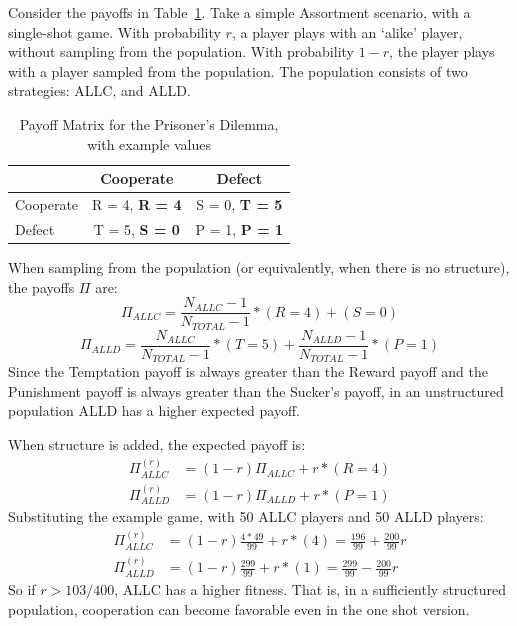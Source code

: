 \documentclass[a4paper,11pt,bcshonoursthesis,singlespace,oneside,thesisdraft,pdflatex]{cssethesis}
\begin{document}
Consider the payoffs in Table~\ref{table:payoffs2}. 
Take a simple Assortment scenario, with a single-shot game. 
With probability $r$, a player plays with an `alike' player, without sampling from the population. 
With probability $1-r$, the player plays with a player sampled from the population. 
The population consists of two strategies: ALLC, and ALLD.

\begin{table}[h]\centering
\captionsetup{justification=centering}
\begin{tabular}{|l|c|c|}
\hline
 & \bf{Cooperate} & \bf{Defect}\\
\hline
Cooperate & R = 4, \bf{R = 4} & S = 0, \bf{T = 5}\\
\hline
Defect & T = 5, \bf{S = 0}  & P = 1, \bf{P = 1} \\
\hline
\end{tabular}
\caption{Payoff Matrix for the Prisoner's Dilemma, with example values}
\label{table:payoffs2}
\end{table}

When sampling from the population (or equivalently, when there is no structure), the payoffs $\Pi$ are:
\begin{equation*}
\Pi_{ALLC}=\frac{N_{ALLC}-1}{N_{TOTAL}-1}*(R=4)+ (S=0)
\end{equation*}
\begin{equation*}
\Pi_{ALLD}=\frac{N_{ALLC}}{N_{TOTAL}-1}*(T=5)+ \frac{N_{ALLD}-1}{N_{TOTAL}-1}*(P=1)
\end{equation*}
Since the Temptation payoff is always greater than the Reward payoff and the Punishment payoff is always greater than the Sucker's payoff, in an unstructured population ALLD has a higher expected payoff. 

When structure is added, the expected payoff is:
\begin{align*}
\Pi^{(r)}_{ALLC}&=(1-r)\Pi_{ALLC}+ r*(R=4)\\
\Pi^{(r)}_{ALLD}&=(1-r)\Pi_{ALLD}+ r*(P=1)
\end{align*}
Substituting the example game, with 50 ALLC players and 50 ALLD players:
\begin{align*}
\Pi^{(r)}_{ALLC}&=(1-r)\frac{4*49}{99}+ r*(4)=\frac{196}{99}+\frac{200}{99}r\\
\Pi^{(r)}_{ALLD}&=(1-r)\frac{299}{99}+ r*(1)=\frac{299}{99}-\frac{200}{99}r
\end{align*}
So if $r>103/400$, ALLC has a higher fitness. 
That is, in a sufficiently structured population, cooperation can become favorable even in the one shot version. 
 
\end{document}
